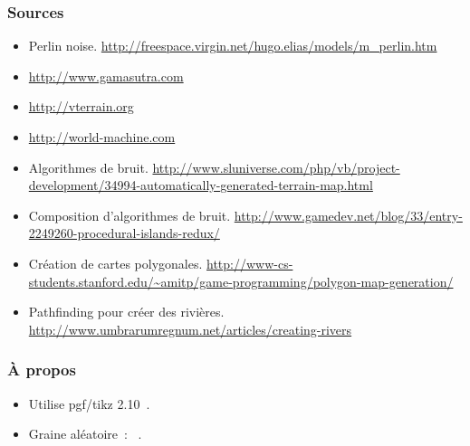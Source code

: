 \documentclass[hyperref={pdfpagelabels=false}]{beamer}
\begin{document}
\begin{frame}
  \frametitle{Sources}
  \begin{itemize}
  \item Perlin noise. {\tiny\url{http://freespace.virgin.net/hugo.elias/models/m_perlin.htm}}
  \item {\tiny\url{http://www.gamasutra.com}}
  \item {\tiny\url{http://vterrain.org}}
  \item {\tiny\url{http://world-machine.com}}
  \item Algorithmes de bruit. {\tiny\url{http://www.sluniverse.com/php/vb/project-development/34994-automatically-generated-terrain-map.html}}
  \item Composition d'algorithmes de bruit. {\tiny\url{http://www.gamedev.net/blog/33/entry-2249260-procedural-islands-redux/}}
  \item Création de cartes polygonales. {\tiny\url{http://www-cs-students.stanford.edu/~amitp/game-programming/polygon-map-generation/}}
  \item Pathfinding pour créer des rivières. {\tiny\url{http://www.umbrarumregnum.net/articles/creating-rivers}}
  \end{itemize}
\end{frame}

\begin{frame}
  \frametitle{À propos}
  \begin{itemize}
  \item Utilise pgf/tikz 2.10~.%
  \item Graine aléatoire~: \noiseseed~.
  \end{itemize}
\end{frame}
\end{document}

